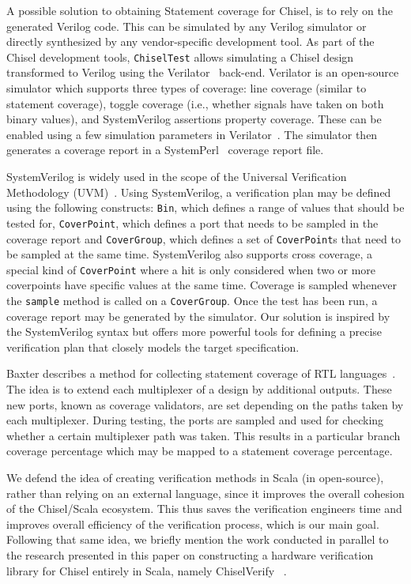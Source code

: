 \documentclass[conference]{IEEEtran}
\begin{document}
A possible solution to obtaining Statement coverage for Chisel, is to rely on the generated Verilog code. 
This can be simulated by any Verilog simulator or directly synthesized by any vendor-specific development tool. 
As part of the Chisel development tools, \texttt{ChiselTest} allows simulating a Chisel design transformed to Verilog using the Verilator~\cite{verilator} back-end.
Verilator is an open-source simulator which supports three types of coverage: line coverage (similar to statement coverage), toggle coverage (i.e., whether signals have taken on both binary values), and SystemVerilog assertions property coverage. 
These can be enabled using a few simulation parameters in Verilator~\cite{tolotto2020}.
The simulator then generates a coverage report in a SystemPerl~\cite{SystemPerl} coverage report file.

SystemVerilog is widely used in the scope of the Universal Verification Methodology (UVM)~\cite{uvm2015}. 
Using SystemVerilog, a verification plan may be defined using the following constructs: \texttt{Bin}, which defines a range of values that should be tested for, \texttt{CoverPoint}, which defines a port that needs to be sampled in the coverage report and \texttt{CoverGroup}, which defines a set of \texttt{CoverPoint}s that need to be sampled at the same time. 
SystemVerilog also supports cross coverage, a special kind of \texttt{CoverPoint} where a hit is only considered when two or more coverpoints have specific values at the same time.
Coverage is sampled whenever the \texttt{sample} method is called on a \texttt{CoverGroup}. 
Once the test has been run, a coverage report may be generated by the simulator. 
Our solution is inspired by the SystemVerilog syntax but offers more powerful tools for defining a precise verification plan that closely models the target specification.

Baxter describes a method for collecting statement coverage of RTL languages~\cite{branch-cov-made-easy:2002}. The idea is to extend each multiplexer of a design by additional outputs. These new ports, known as coverage validators, are set depending on the paths taken by each multiplexer. During testing, the ports are sampled and used for checking whether a certain multiplexer path was taken. This results in a particular branch coverage percentage which may be mapped to a statement coverage percentage.

We defend the idea of creating verification methods in Scala (in open-source), rather than relying on an external language, since it improves the overall cohesion of the Chisel/Scala ecosystem. 
This thus saves the verification engineers time and improves overall efficiency of the verification process, which is our main goal. 
Following that same idea, we briefly mention the work conducted in parallel to the research presented in this paper on constructing a hardware verification library for Chisel entirely in Scala, namely ChiselVerify~\cite{blind} %
.
\end{document}
